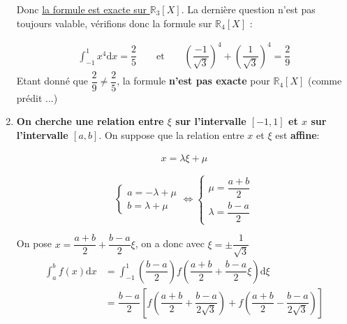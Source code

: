 \documentclass[a4paper]{article}
\begin{document}
\begin{enumerate}
Donc \underline{la formule est exacte sur $\mathbb{R}_3[X]$}. La dernière question n'est pas toujours valable, vérifions donc la formule sur $\mathbb{R}_4[X]$ : 

\begin{align*}
\int^1_{-1} x^4 \text{d}x = \dfrac{2}{5} \qquad \text{et} \qquad \left( \dfrac{-1}{\sqrt{3}}\right)^4 + \left( \dfrac{1}{\sqrt{3}}\right)^4 = \dfrac{2}{9}
\end{align*}
Etant donné que $\dfrac{2}{9}\neq \dfrac{2}{5}$, la formule \textbf{n'est pas exacte} pour $\mathbb{R}_4[X]$ (comme prédit ...)

\item \textbf{On cherche une relation entre $\xi$ sur l'intervalle $[-1,1]$ et $x$ sur l'intervalle $[a,b]$}. On suppose que la relation entre $x$ et $\xi$ est \textbf{affine}: 

\begin{align*}
x=\lambda \xi + \mu
\end{align*}



$$
\left\{
    \begin{array}{l}
        a= -\lambda + \mu   \\ 
		b=  \lambda + \mu 
    \end{array}
\right. 
\Longleftrightarrow
\left\{
    \begin{array}{ll}
        \mu = \dfrac{a+b}{2} \\ 
		\lambda = \dfrac{b-a}{2}
    \end{array}
\right.
$$



On pose $x = \dfrac{a+b}{2} + \dfrac{b-a}{2} \xi$, on a donc avec $\xi = \pm \dfrac{1}{\sqrt{3}} $
\begin{align*}
\int^b_a f(x) \text{d}x & = \int^1_{-1} \left( \dfrac{b-a}{2} \right) f\left( \dfrac{a+b}{2} + \dfrac{b-a}{2} \xi\right) \text{d}\xi \\
& = \dfrac{b-a}{2} \left[ f\left( \dfrac{a+b}{2} + \dfrac{b-a}{2\sqrt{3}}\right) + f\left( \dfrac{a+b}{2} - \dfrac{b-a}{2\sqrt{3}}\right) \right]
\end{align*}

\end{enumerate}
\end{document}
